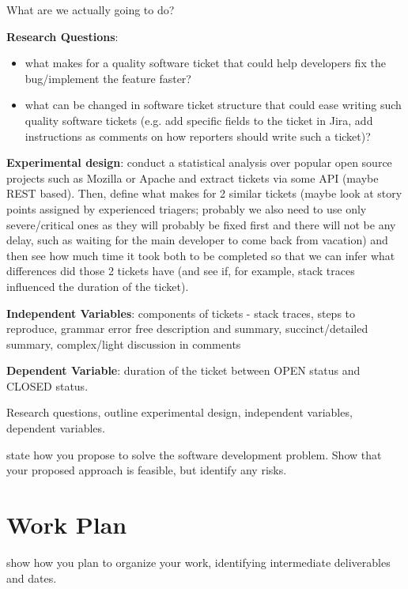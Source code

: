 \documentclass{mprop}
\begin{document}
What are we actually going to do?

\textbf{Research Questions}:
\begin{itemize}
  \item what makes for a quality software ticket that could help developers
    fix the bug/implement the feature faster?
  \item what can be changed in software ticket structure that could ease writing
    such quality software tickets (e.g. add specific fields to the ticket in
    Jira, add instructions as comments on how reporters should write such a 
    ticket)?
  \end{itemize}

\textbf{Experimental design}: conduct a statistical analysis over popular 
open source projects such as Mozilla or Apache and extract tickets via 
some API (maybe REST based). Then, define what makes for 2 similar tickets
(maybe look at story points assigned by experienced triagers; probably we also
need to use only severe/critical ones as they will probably be fixed first
and there will not be any delay, such as waiting for the main developer to come
back from vacation) and then see how much time it took both to be completed
so that we can infer what differences did those 2 tickets have (and see if, for
example, stack traces influenced the duration of the ticket). 

\textbf{Independent Variables}: components of tickets - stack traces, steps
to reproduce, grammar error free description and summary, succinct/detailed 
summary, complex/light discussion in comments

\textbf{Dependent Variable}: duration of the ticket between OPEN status and
CLOSED status.

Research questions, outline experimental design, independent variables, dependent variables.

state how you propose to solve the software development problem. Show that your proposed approach is feasible, but identify any risks.

\section{Work Plan}


show how you plan to organize your work, identifying intermediate deliverables and dates.



\end{document}
